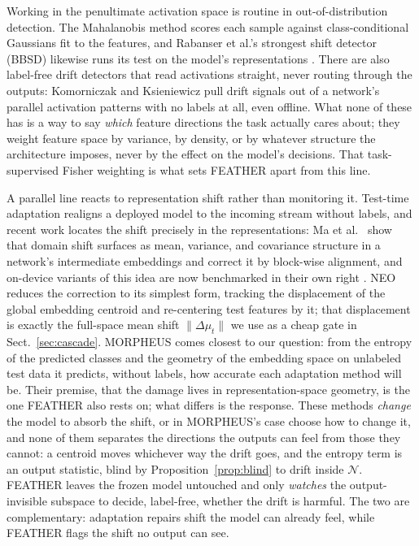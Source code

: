 \documentclass[acmsmall,screen]{acmart}
\theoremstyle{acmdefinition}
\begin{document}
Working in the penultimate activation space is routine in out-of-distribution
detection. The Mahalanobis method \cite{lee2018mahalanobis} scores each
sample against class-conditional Gaussians fit to the features, and Rabanser
et al.'s strongest shift detector (BBSD) likewise runs its test on the
model's representations \cite{rabanser2019failing}. There are also label-free
drift detectors that read activations straight, never routing through the
outputs: Komorniczak and Ksieniewicz \cite{komorniczak2024parallel} pull
drift signals out of a network's parallel activation patterns with no labels
at all, even offline. What none of these has is a way to say \emph{which}
feature directions the task actually cares about; they weight feature space
by variance, by density, or by whatever structure the architecture imposes,
never by the effect on the model's decisions. That task-supervised Fisher
weighting is what sets FEATHER apart from this line.

A parallel line reacts to representation shift rather than monitoring it.
Test-time adaptation realigns a deployed model to the incoming stream without
labels, and recent work locates the shift precisely in the representations: Ma
et al.\ \cite{ma2026pea} show that domain shift surfaces as mean, variance, and
covariance structure in a network's intermediate embeddings and correct it by
block-wise alignment, and on-device variants of this idea are now benchmarked
in their own right \cite{danilowski2026botta}. NEO \cite{murphy2026neo} reduces
the correction to its simplest form, tracking the displacement of the global
embedding centroid and re-centering test features by it; that displacement is
exactly the full-space mean shift $\lVert\Delta\mu_t\rVert$ we use as a cheap
gate in Sect.~\ref{sec:cascade}. MORPHEUS \cite{danilowski2026morpheus} comes
closest to our question: from the entropy of the predicted classes and the
geometry of the embedding space on unlabeled test data it predicts, without
labels, how accurate each adaptation method will be. Their premise, that the damage
lives in representation-space geometry, is the one FEATHER also rests on; what
differs is the response. These methods \emph{change} the model to absorb the
shift, or in MORPHEUS's case choose how to change it, and none of them separates
the directions the outputs can feel from those they cannot: a centroid moves
whichever way the drift goes, and the entropy term is an output statistic, blind
by Proposition~\ref{prop:blind} to drift inside $\mathcal{N}$. FEATHER leaves the frozen model
untouched and only \emph{watches} the output-invisible subspace to decide,
label-free, whether the drift is harmful. The two are complementary: adaptation
repairs shift the model can already feel, while FEATHER flags the shift no
output can see.
\end{document}
